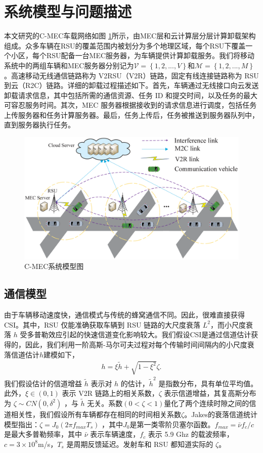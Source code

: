 \section{系统模型与问题描述}\label{section3-2}
本文研究的C-MEC车载网络如图 \ref{F1}所示，由MEC层和云计算层分层计算卸载架构组成。众多车辆在RSU的覆盖范围内被划分为多个地理区域，每个RSU下覆盖一个小区，每个RSU配备一台MEC服务器，为车辆提供计算卸载服务。我们将移动系统中的两组车辆和MEC服务器分别记为$\mathcal{V}=\left\{1,2,..., V\right\}$和$\mathcal{M}=\left\{1,2,..., M\right\}$。高速移动无线通信链路称为 V2RSU（V2R）链路，固定有线连接链路称为 RSU 到云（R2C）链路。详细的卸载过程描述如下。首先，车辆通过无线接口向云发送卸载请求信息，其中包括所需的通信资源、任务 ID 和提交时间，以及任务的最大可容忍服务时间。其次，MEC 服务器根据接收到的请求信息进行调度，包括任务上传服务器和任务计算服务器。最后，任务上传后，任务被推送到服务器队列中，直到服务器执行任务。
\begin{figure}[H]
\centering
\includegraphics[width=12cm]{figures//chap3//model2.eps}
\caption{C-MEC系统模型图}
\label{F1}
\end{figure}

\subsection{通信模型}\label{section3-2-1}
由于车辆移动速度快，通信模式与传统的蜂窝通信不同。因此，很难直接获得 CSI。其中，RSU 仅能准确获取车辆到 RSU 链路的大尺度衰落 $L^2$，而小尺度衰落 $h$ 受多普勒效应引起的快速信道变化影响较大。我们假设CSI是通过信道估计获得的，因此，我们利用一阶高斯-马尔可夫过程\cite{Kim2011}对每个传输时间间隔内的小尺度衰落信道估计$h$建模如下，
\begin{eqnarray}\label{E1}
h=\xi{\widetilde{h}}+\sqrt{1-\xi^2}\zeta.
\end{eqnarray}
我们假设估计的信道增益 $\widetilde{h}$ 表示对 $h$ 的估计，${\widetilde{h}}^2$ 是指数分布，具有单位平均值\cite{Sakr2014}。此外，$\xi\in\left(0,1\right)$ 表示 V2R 链路上的相关系数，$\zeta$ 表示信道增益，其复高斯分布为 $\zeta\sim CN\left(0,\delta^2\right)$ ，与 $\widetilde{h}$ 无关。系数$\left(0<\zeta<1\right)$量化了两个连续时隙之间的信道相关性，我们假设所有车辆都存在相同的时间相关系数$\zeta$。Jakes的衰落信道统计模型\cite{Kim2011}指出：$\zeta=J_0\left(2\pi f_{max}T_s\right)$ ，其中$J_0$是第一类零阶贝塞尔函数。$f_{max}=\bar{\nu}f_c/c $ 是最大多普勒频率，其中 $\bar{\nu}$ 表示车辆速度，$f_c$ 表示 5.9 Ghz 的载波频率，$c=3\times{10}^8$m/s，$T_s$ 是周期反馈延迟。发射车和 RSU 都知道实际的 $\zeta$。

